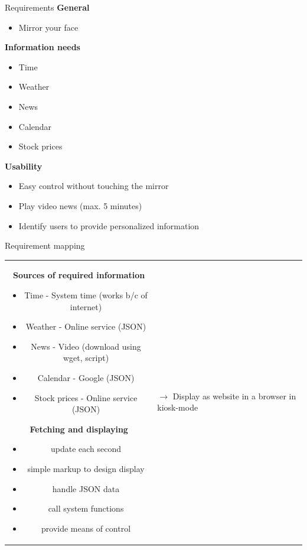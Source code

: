 \documentclass[xcolor=svgnames,handout,aspectratio=169]{beamer}
\begin{document}
\begin{frame}
	{Requirements}
	\textbf{General}
	\begin{itemize}
		\item Mirror your face
	\end{itemize}
	\vspace{5mm}

	\textbf{Information needs}
	\begin{itemize}
		\item Time
		\item Weather
		\item News
		\item Calendar
		\item Stock prices
	\end{itemize}
	
	\vspace{5mm}
	
	\textbf{Usability}
	\begin{itemize}
		\item Easy control without touching the mirror
		\item Play video news (max. 5 minutes)
		\item Identify users to provide personalized information
	\end{itemize}
\end{frame}

\begin{frame}
	{Requirement mapping}
	
	\begin{tabular}{cl}  
			\parbox{0.6\linewidth}{
				\textbf{Sources of required information}
				\begin{itemize}
					\item Time - System time (works b/c of internet)
					\item Weather - Online service (JSON)
					\item News - Video (download using wget, script)
					\item Calendar - Google (JSON)
					\item Stock prices - Online service (JSON)
				\end{itemize}
				
				\textbf{Fetching and displaying}
				\begin{itemize}
					\item update each second
					\item simple markup to design display
					\item handle JSON data
					\item call system functions
					\item provide means of control 
				\end{itemize}
			}
		&
			\parbox{0.4\linewidth}{
				$\rightarrow$ Display as website in a browser in kiosk-mode
			}
	\end{tabular}
\end{frame}
\end{document}
